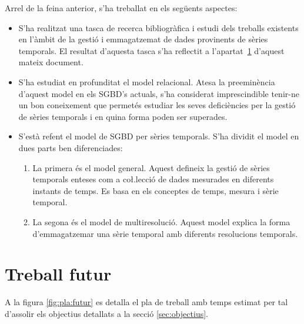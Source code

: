Arrel de la feina anterior, s'ha treballat en els següents aspectes:
\begin{itemize}
\item S'ha realitzat una tasca de recerca bibliogràfica i estudi dels
  treballs existents en l'àmbit de la gestió i emmagatzemat de dades
  provinents de sèries temporals. El resultat d'aquesta tasca s'ha
  reflectit a l'apartat~\ref{} d'aquest mateix document.
\item S'ha estudiat en profunditat el model relacional. Atesa la
  preeminència d'aquest model en els SGBD's actuals, s'ha considerat
  imprescindible tenir-ne un bon coneixement que permetés estudiar les
  seves deficiències per la gestió de sèries temporals i en quina
  forma poden ser superades.
\item S'està refent el model de SGBD per sèries temporals.  S'ha
  dividit el model en dues parts ben diferenciades:
  \begin{enumerate}
  \item La primera és el model general. Aquest defineix la gestió de
    sèries temporals enteses com a co\l.lecció de dades mesurades en
    diferents instants de temps. Es basa en els conceptes de temps,
    mesura i sèrie temporal.
  \item La segona és el model de multiresolució. Aquest model explica
    la forma d'emmagatzemar una sèrie temporal amb diferents
    resolucions temporals.
  \end{enumerate}
\end{itemize}


\section{Treball futur}


A la figura \ref{fig:pla:futur} es detalla el pla de treball amb temps
estimat per tal d'assolir els objectius detallats a la secció
\ref{sec:objectius}.

